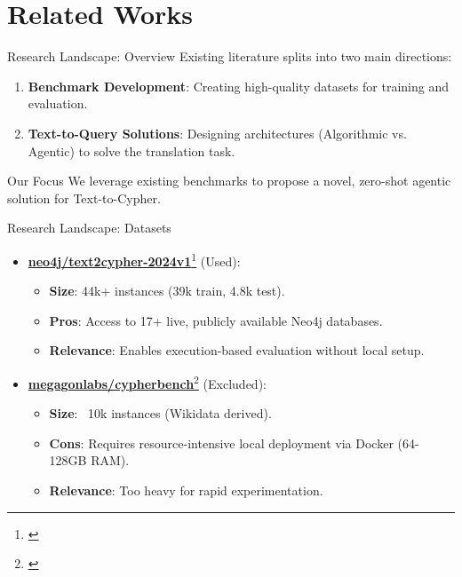 \documentclass[aspectratio=169]{beamer}
\begin{document}
\section{Related Works}

\begin{frame}{Research Landscape: Overview}
    Existing literature splits into two main directions:
    \vspace{0.5cm}
    \begin{enumerate}
        \item \textbf{Benchmark Development}: 
        Creating high-quality datasets for training and evaluation.
        \item \textbf{Text-to-Query Solutions}: 
        Designing architectures (Algorithmic vs. Agentic) to solve the translation task.
    \end{enumerate}
    \vspace{0.5cm}
    \begin{block}{Our Focus}
        We leverage existing benchmarks to propose a novel, zero-shot agentic solution for Text-to-Cypher.
    \end{block}
\end{frame}

\begin{frame}{Research Landscape: Datasets}
    \begin{itemize}
        \item \href{https://huggingface.co/datasets/neo4j/text2cypher-2024v1}{\textbf{neo4j/text2cypher-2024v1}}\footnote{\cite{neo4jlabs-text2cypher-2024}} (Used):
        \begin{itemize}
            \item \textbf{Size}: 44k+ instances (39k train, 4.8k test).
            \item \textbf{Pros}: Access to 17+ live, publicly available Neo4j databases.
            \item \textbf{Relevance}: Enables execution-based evaluation without local setup.
        \end{itemize}
        \vspace{0.5em}
        \item \href{https://huggingface.co/datasets/megagonlabs/cypherbench}{\textbf{megagonlabs/cypherbench}}\footnote{\cite{cypherbench-megagonlabs-2024}} (Excluded):
        \begin{itemize}
            \item \textbf{Size}: ~10k instances (Wikidata derived).
            \item \textbf{Cons}: Requires resource-intensive local deployment via Docker (64-128GB RAM).
            \item \textbf{Relevance}: Too heavy for rapid experimentation.
        \end{itemize}
    \end{itemize}
\end{frame}
\end{document}
